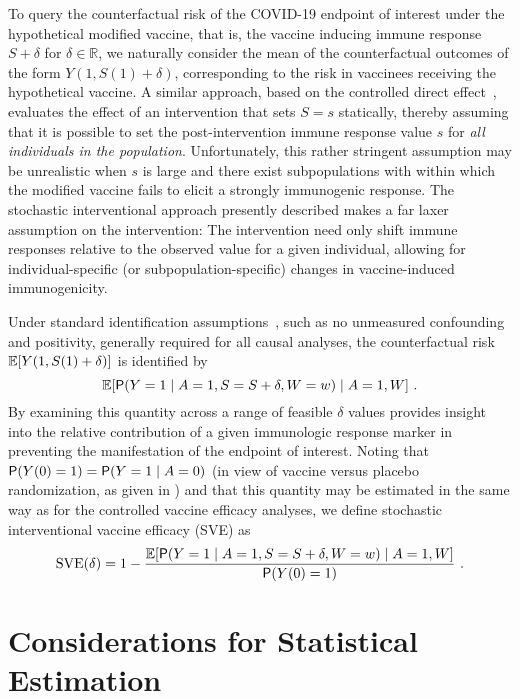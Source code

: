 To query the counterfactual risk of the COVID-19 endpoint of interest under the
hypothetical modified vaccine, that is, the vaccine inducing immune response $S
+ \delta$ for $\delta \in \mathbb{R}$, we naturally consider the mean of the
counterfactual outcomes of the form $Y(1, S(1) + \delta)$, corresponding to the
risk in vaccinees receiving the hypothetical vaccine. A similar approach, based
on the controlled direct effect~\citep{benkeser2021inference}, evaluates the
effect of an intervention that sets $S = s$ statically, thereby assuming that it
is possible to set the post-intervention immune response value $s$ for
\textit{all individuals in the population}. Unfortunately, this rather stringent
assumption may be unrealistic when $s$ is large and there exist subpopulations
with within which the modified vaccine fails to elicit a strongly immunogenic
response. The stochastic interventional approach presently described makes a far
laxer assumption on the intervention: The intervention need only
shift immune responses relative to the observed value for a given individual,
allowing for individual-specific (or subpopulation-specific) changes in
vaccine-induced immunogenicity.

Under standard identification assumptions~\citep{diaz2012population,
hejazi2020efficient}, such as no unmeasured confounding and positivity,
generally required for all causal analyses, the counterfactual risk
$\E[Y(1, S(1)
+ \delta)]$ is identified by
\begin{equation}\label{eqn:stochintrisk}
  \E[\P(Y = 1 \mid A = 1, S = S + \delta, W = w) \mid A = 1, W] \ .
\end{equation}
By examining this quantity across a range of feasible $\delta$ values provides
insight into the relative contribution of a given immunologic response marker in
preventing the manifestation of the endpoint of interest.
Noting that $\P(Y(0)=1) = \P(Y=1 \mid A=0)$ (in view of vaccine
versus placebo randomization, as given in \citep{gilbert2021assessment}) and
that
this quantity may
be estimated in the same way as for the controlled vaccine efficacy analyses,
we define
stochastic interventional vaccine efficacy (SVE) as
\begin{equation}\label{eqn:sve}
\text{SVE}(\delta) = 1 - \frac{\E[\P(Y = 1 \mid A = 1, S = S + \delta, W = w)
\mid A = 1, W]}{\P(Y(0)=1)} \ .
\end{equation}

\section{Considerations for Statistical Estimation}


